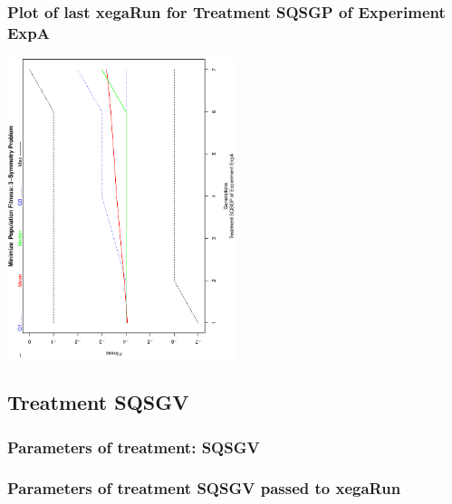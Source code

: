 \documentclass[18pt,c]{beamer}
\makeatletter
\def\beamer@writeslidentry@miniframesoff{%
  \expandafter\beamer@ifempty\expandafter{\beamer@framestartpage}{}%
  {%
   \clearpage\beamer@notesactions%
  }
}
\newcommand*{\miniframesoff}{\let\beamer@writeslidentry=\beamer@writeslidentry@miniframesoff}
\makeatother
\begin{document}
 \begin{frame}
 \frametitle{ Plot of last xegaRun for Treatment SQSGP of Experiment ExpA }
 \begin{center}
\includegraphics[width=0.5\textwidth, angle=-90]
{ExpAPlotPopStatsFigure004.eps}
 \end{center}
 \label{report/ExpAPlotPopStatsFigure004.eps}  
 \end{frame}

\miniframesoff
\subsection{Treatment SQSGV}

 \begin{frame}
 \fontsize{8pt}{9pt}\selectfont
 \frametitle{  Parameters of treatment: SQSGV 
 }

 \label{ExpAtParmTable020.tex}  
 \end{frame}


 \begin{frame}
 \fontsize{8pt}{9pt}\selectfont
 \frametitle{  Parameters of treatment SQSGV passed to xegaRun
 }

 \label{ExpAtParmTable021.tex}  
 \end{frame}

\end{document}
